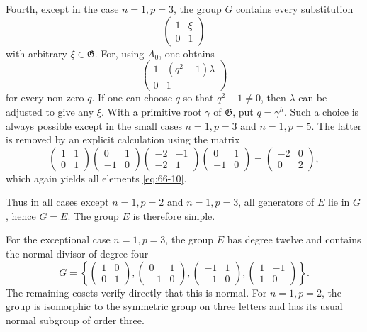 \documentclass[11pt,a4paper]{book}
\begin{document}
Fourth, except in the case \(n=1,p=3\), the group \(G\) contains every substitution
\begin{equation}\label{eq:66-10}
 \begin{pmatrix}1&\xi\\0&1\end{pmatrix}
\end{equation}
with arbitrary \(\xi\in\mathfrak G\).  For, using \(A_0\), one obtains
\begin{equation}\label{eq:66-11}
 \begin{pmatrix}1&(q^2-1)\lambda\\0&1\end{pmatrix}
\end{equation}
for every non-zero \(q\).  If one can choose \(q\) so that \(q^2-1\ne0\), then \(\lambda\) can be adjusted to give any \(\xi\).  With a primitive root \(\gamma\) of \(\mathfrak G\), put \(q=\gamma^h\).  Such a choice is always possible except in the small cases \(n=1,p=3\) and \(n=1,p=5\).  The latter is removed by an explicit calculation using the matrix
\[
 \begin{pmatrix}1&1\\0&1\end{pmatrix}
 \begin{pmatrix}0&1\\-1&0\end{pmatrix}
 \begin{pmatrix}-2&-1\\-2&1\end{pmatrix}
 \begin{pmatrix}0&1\\-1&0\end{pmatrix}
 =
 \begin{pmatrix}-2&0\\0&2\end{pmatrix},
\]
which again yields all elements \eqref{eq:66-10}.

Thus in all cases except \(n=1,p=2\) and \(n=1,p=3\), all generators of \(E\) lie in \(G\), hence \(G=E\).  The group \(E\) is therefore simple.

For the exceptional case \(n=1,p=3\), the group \(E\) has degree twelve and contains the normal divisor of degree four
\begin{equation}\label{eq:66-exception3}
 G=\left\{
 \begin{pmatrix}1&0\\0&1\end{pmatrix},
 \begin{pmatrix}0&1\\-1&0\end{pmatrix},
 \begin{pmatrix}-1&1\\-1&0\end{pmatrix},
 \begin{pmatrix}1&-1\\1&0\end{pmatrix}
 \right\}.
\end{equation}
The remaining cosets verify directly that this is normal.  For \(n=1,p=2\), the group is isomorphic to the symmetric group on three letters and has its usual normal subgroup of order three.
\end{document}
